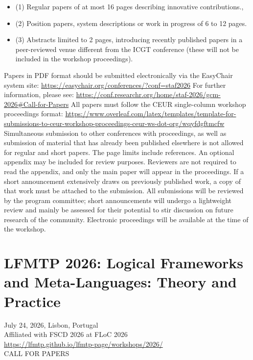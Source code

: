 \documentclass[prodmode,acmtecs]{acmsmall} %
\begin{document}
\begin{itemize}
\begin{itemize}\item  (1) Regular papers of at most 16 pages describing innovative contributions.,
\item  (2) Position papers, system descriptions or work in progress of 6 to 12 pages.
\item  (3) Abstracts limited to 2 pages, introducing recently published papers in a peer-reviewed venue different from the ICGT conference (these will not be included in the workshop proceedings).
\end{itemize} 
  Papers in PDF format should be submitted electronically via the EasyChair system site: \href{https://easychair.org/conferences/?conf=staf2026}{https://easychair.org/conferences/?conf=staf2026} For further information, please see: \href{https://conf.researchr.org/home/staf-2026/gcm-2026#Call-for-Papers}{https://conf.researchr.org/home/staf-2026/gcm-2026\#Call-for-Papers} All papers must follow the CEUR single-column workshop proceedings format:  \href{https://www.overleaf.com/latex/templates/template-for-submissions-to-ceur-workshop-proceedings-ceur-ws-dot-org/wqyfdgftmcfw}{https://www.overleaf.com/latex/templates/template-for-submissions-to-ceur-workshop-proceedings-ceur-ws-dot-org/wqyfdgftmcfw} Simultaneous submission to other conferences with proceedings, as well as submission of material that has already been published elsewhere is not allowed for regular and short papers. The page limits include references. An optional appendix may be included for review purposes. Reviewers are not required to read the appendix, and only the main paper will appear in the proceedings. If a short announcement extensively draws on previously published work, a copy of that work must be attached to the submission. All submissions will be reviewed by the program committee; short announcements will undergo a lightweight review and mainly be assessed for their potential to stir discussion on future research of the community. Electronic proceedings will be available at the time of the workshop. 
 
\end{itemize}\section{LFMTP 2026: Logical Frameworks and Meta-Languages: Theory and Practice}\label{LFMTP2026}  July 24, 2026, Lisbon, Portugal\\ 
  Affiliated with FSCD 2026 at FLoC 2026\\ 
  \href{https://lfmtp.github.io/lfmtp-page/workshops/2026/}{https://lfmtp.github.io/lfmtp-page/workshops/2026/}\\ 
CALL FOR PAPERS 
\end{document}
